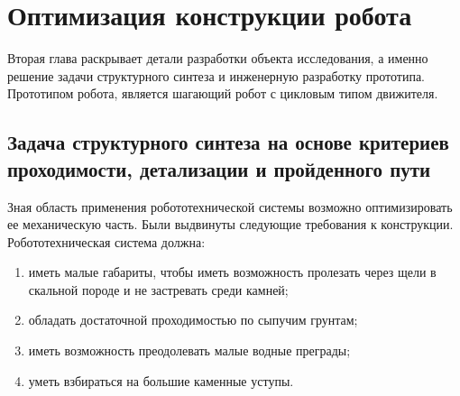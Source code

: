 \chapter{Оптимизация конструкции робота}\label{ch:ch2}

Вторая глава раскрывает детали разработки объекта исследования, а именно решение задачи структурного синтеза и инженерную разработку прототипа. Прототипом робота, является шагающий робот с цикловым типом движителя. 

\section{Задача структурного синтеза на основе критериев проходимости, детализации и пройденного пути}

Зная область применения робототехнической системы возможно оптимизировать ее механическую часть. Были выдвинуты следующие требования к конструкции. Робототехническая система должна:
\begin{enumerate}
    \item иметь малые габариты, чтобы иметь возможность пролезать через щели в скальной породе и не застревать среди камней;
    \item обладать достаточной проходимостью по сыпучим грунтам;
    \item иметь возможность преодолевать малые водные преграды;
    \item уметь  взбираться на большие каменные уступы.
\end{enumerate}

